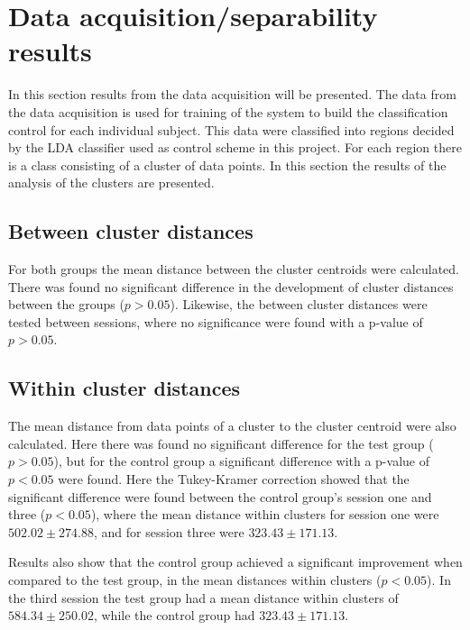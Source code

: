 \section{Data acquisition/separability results}
In this section results from the data acquisition will be presented. The data from the data acquisition is used for training of the system to build the classification control for each individual subject. This data were classified into regions decided by the LDA classifier used as control scheme in this project. For each region there is a class consisting of a cluster of data points. In this section the results of the analysis of the clusters are presented. %


\subsection{Between cluster distances}

For both groups the mean distance between the cluster centroids were calculated. There was found no significant difference in the development of cluster distances between the groups ($p > 0.05$). Likewise, the between cluster distances were tested between sessions, where no significance were found with a p-value of $p > 0.05$.


\subsection{Within cluster distances}
The mean distance from data points of a cluster to the cluster centroid were also calculated. Here there was found no significant difference for the test group ($p > 0.05$), but for the control group a significant difference with a p-value of $p < 0.05$ were found. Here the Tukey-Kramer correction showed that the significant difference were found between the control group's session one and three ($p < 0.05$), where the mean distance within clusters for session one were $502.02 \pm 274.88$, and for session three were $323.43 \pm 171.13$. 

Results also show that the control group achieved a significant improvement when compared to the test group, in the mean distances within clusters ($p < 0.05$). In the third session the test group had a mean distance within clusters of $584.34 \pm 250.02$, while the control group had $323.43 \pm 171.13$. 


